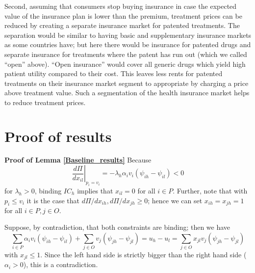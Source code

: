 \documentclass[a4paper,12pt]{article}
\begin{document}
Second, assuming that consumers stop buying insurance in case the expected value of the insurance plan is lower than the premium, treatment prices can be reduced by creating a separate insurance market for patented treatments. The separation would be similar to having basic and supplementary insurance markets as some countries have; but here there would be insurance for patented drugs and separate insurance for treatments  where the patent has run out (which we called ``open'' above). ``Open insurance'' would cover all generic drugs which yield high patient utility compared to their cost. This leaves less rents for patented treatments on their insurance market segment to appropriate by charging a price above treatment value. Such a segmentation of the health insurance market helps to reduce treatment prices.









\newpage
\appendix


\setcounter{table}{0}
\renewcommand{\thetable}{\thesection\arabic{table}}



\section{Proof of results}
\label{sec:org0d3528b}

\textbf{Proof of Lemma \ref{Baseline_results}}
Because
\begin{equation}
\label{eq:16}
\left. \frac{d\Pi}{d x_{il}}\right|_{p_i=v_i} = - \lambda_h \alpha_i v_i (\psi_{ih}-\psi_{il}) < 0
\end{equation}
for \(\lambda_h >0\), binding \(IC_h\) implies that \(x_{il} =0\) for all \(i \in P\). Further, note that with \(p_i \leq v_i\) it is the case that \(d \Pi/d x_{ih}, d \Pi/d x_{jh} \geq 0\); hence we can set \(x_{ih} = x_{jh} =1\) for all \(i \in P, j \in O\).

Suppose, by contradiction, that both constraints are binding; then we have
\begin{equation}
\label{eq:17}
 \sum_{i \in P} \alpha_i v_i (\psi_{ih}-\psi_{il}) + \sum_{j \in O} v_j (\psi_{jh}-\psi_{jl})  = u_h - u_l = \sum_{j \in O} x_{jl} v_j (\psi_{jh}-\psi_{jl})
\end{equation}
with \(x_{jl} \leq 1\). Since the left hand side is strictly bigger than the right hand side (\(\alpha_i > 0\)), this is a contradiction.
\end{document}
